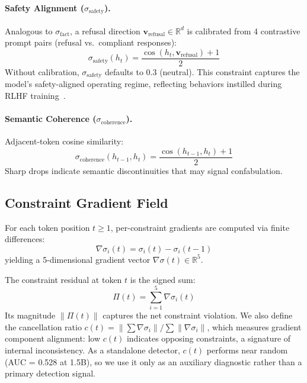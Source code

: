 \documentclass[11pt]{article}
\begin{document}
\paragraph{Safety Alignment ($\sigma_{\text{safety}}$).}
Analogous to $\sigma_{\text{fact}}$, a refusal direction $\mathbf{v}_{\text{refusal}} \in \mathbb{R}^d$ is calibrated from 4 contrastive prompt pairs (refusal vs.\ compliant responses):
\begin{equation}
\sigma_{\text{safety}}(h_t) = \frac{\cos(h_t, \mathbf{v}_{\text{refusal}}) + 1}{2}
\end{equation}
Without calibration, $\sigma_{\text{safety}}$ defaults to 0.3 (neutral). This constraint captures the model's safety-aligned operating regime, reflecting behaviors instilled during RLHF training~\cite{ouyang2022training}.

\paragraph{Semantic Coherence ($\sigma_{\text{coherence}}$).}
Adjacent-token cosine similarity:
\begin{equation}
\sigma_{\text{coherence}}(h_{t-1}, h_t) = \frac{\cos(h_{t-1}, h_t) + 1}{2}
\end{equation}
Sharp drops indicate semantic discontinuities that may signal confabulation.

\subsection{Constraint Gradient Field}

For each token position $t \geq 1$, per-constraint gradients are computed via finite differences:
\begin{equation}
\nabla\sigma_i(t) = \sigma_i(t) - \sigma_i(t-1)
\end{equation}
yielding a 5-dimensional gradient vector $\nabla\sigma(t) \in \mathbb{R}^5$.

The constraint residual at token $t$ is the signed sum:
\begin{equation}
\Pi(t) = \sum_{i=1}^{5} \nabla\sigma_i(t)
\end{equation}
Its magnitude $\|\Pi(t)\|$ captures the net constraint violation. We also define the cancellation ratio $c(t) = \|\sum \nabla\sigma_i\| / \sum \|\nabla\sigma_i\|$, which measures gradient component alignment: low $c(t)$ indicates opposing constraints, a signature of internal inconsistency. As a standalone detector, $c(t)$ performs near random (AUC = 0.528 at 1.5B), so we use it only as an auxiliary diagnostic rather than a primary detection signal.
\end{document}
